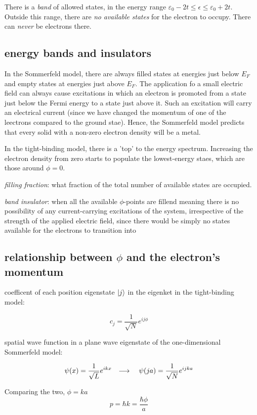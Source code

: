 \documentclass[10pt, a4paper, twocolumn]{article}
\newcommand{\deff}[1]{\par \noindent \textit{#1}: }
\newcommand{\arr}{\ensuremath{\longrightarrow\ }}
\newcommand{\eps}{\ensuremath{\varepsilon _0}}
\begin{document}
There is a \emph{band} of allowed states, in the energy range
$\eps -2t \leq \epsilon \leq \eps + 2t$. 
Outside this range, there are \emph{no available states} for the electron to occupy. There can \emph{never} be electrons there.

\subsection{energy bands and insulators}

In the Sommerfeld model, there are always filled states at energies just below $E_F$ and empty states at energies just above $E_F$. The application fo a small electric field can always cause excitations in which an electron is promoted from a state just below the Fermi energy to a state just above it. Such an excitation will carry an electrical current (since we have changed the momentum of one of the leectrons compared to the ground stae). Hence, the Sommerfeld model predicts that every solid with a non-zero electron density will be a metal.

In the tight-binding model, there is a 'top' to the energy spectrum. Increasing the electron density from zero starts to populate the lowest-energy staes, which are those around $\phi =0$.

\deff{filling fraction} what fraction of the total number of available states are occupied.

\deff{band insulator}
when all the available $\phi$-points are fillend meaning there is no possibility of any current-carrying excitations of the system, irrespective of the strength of the applied electric field, since there would be simply no states available for the electrons to transition into
\subsection{relationship between $\phi$ and the electron's momentum}

coefficent of each position eigenstate $\ket j$ in the eigenket in the tight-binding model:

\[c_j = \frac{1}{\sqrt N} e^{ij\phi} \]

spatial wave function in a plane wave eigenstate of the one-dimensional Sommerfeld model:

\[\psi (x) = \frac{1}{\sqrt L} e^{ikx}
\qq{\arr} \psi (ja) = \frac{1}{\sqrt N} e^{ijka}
\]

Comparing the two, $\phi =ka$
\[p = \hbar k=\frac{\hbar \phi}{a} \]
\end{document}
